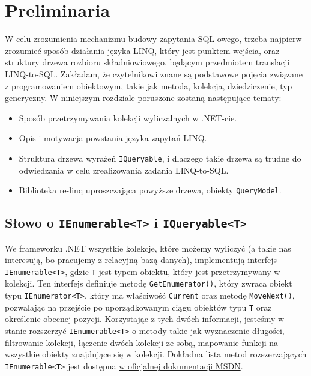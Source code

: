 \chapter{Preliminaria}
W celu zrozumienia mechanizmu budowy zapytania SQL-owego, trzeba najpierw zrozumieć sposób działania języka LINQ, który jest punktem wejścia, oraz struktury drzewa rozbioru składniowiowego, będącym przedmiotem translacji \linebreak LINQ-to-SQL. Zakładam, że czytelnikowi znane są podstawowe pojęcia związane z programowaniem obiektowym, takie jak metoda, kolekcja, dziedziczenie, typ generyczny. W niniejszym rozdziale poruszone zostaną następujące tematy:

\begin{itemize}
\item Sposób przetrzymywania kolekcji wyliczalnych w .NET-cie.
\item Opis i motywacja powstania języka zapytań LINQ.
\item Struktura drzewa wyrażeń \texttt{IQueryable}, i dlaczego takie drzewa są trudne do odwiedzania w celu zrealizowania zadania LINQ-to-SQL.
\item Biblioteka re-linq uproszczająca powyższe drzewa, obiekty \texttt{QueryModel}.
\end{itemize}

\section{Słowo o \texttt{IEnumerable<T>} i \texttt{IQueryable<T>}}
We frameworku .NET wszystkie kolekcje, które możemy wyliczyć (a takie nas interesują, bo pracujemy z relacyjną bazą danych), implementują interfejs \linebreak \texttt{IEnumerable<T>}, gdzie \texttt{T} jest typem obiektu, który jest przetrzymywany w kolekcji. Ten interfejs definiuje metodę \texttt{GetEnumerator()}, który zwraca obiekt typu \texttt{IEnumerator<T>}, który ma właściwość \texttt{Current} oraz metodę \texttt{MoveNext()}, pozwalając na przejście po uporządkowanym ciągu obiektów typu \texttt{T} oraz określenie obecnej pozycji. Korzystając z tych dwóch informacji, jesteśmy w stanie rozszerzyć \texttt{IEnumerable<T>} o metody takie jak wyznaczenie długości, filtrowanie kolekcji, łączenie dwóch kolekcji ze sobą, mapowanie funkcji na wszystkie obiekty znajdujące się w kolekcji. Dokładna lista metod rozszerzających \texttt{IEnumerable<T>} jest dostępna \href{https://msdn.microsoft.com/pl-pl/library/9eekhta0(v=vs.110).aspx}{w oficjalnej dokumentacji MSDN}. \pagebreak

